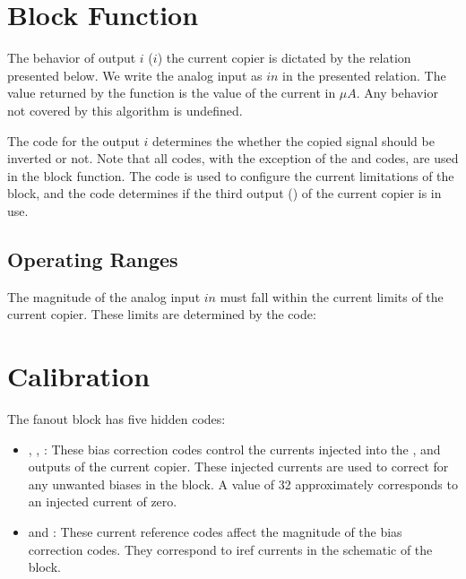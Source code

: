   
\section{Block Function}\label{fanout:blockfun}
The behavior of output $i$ ($i$) the current copier is dictated by the
relation presented below. We write the analog input as $in$ in the presented
relation. The value returned by the function is the value of the current in $\mu
A$. Any behavior not covered by this algorithm is undefined.

\begin{algorithmic}
  \EndIf
\end{algorithmic}

The  code for the output $i$ determines the whether the copied signal
should be inverted or not. Note that all \static codes, with the exception of
the  and  codes, are used in the block function. The  code is
used to configure the current limitations of the block, and the  code
determines if the third output () of the current copier is in use.

\subsection{Operating Ranges}

The magnitude of the analog input $in$ must fall within the current limits of
the current copier. These limits are determined by the  code:

\begin{algorithmic}
\end{algorithmic}
\section{Calibration}\label{fanout:calib}

The fanout block has five hidden codes:

\begin{itemize}
\item{}, , : These bias
  correction codes control the currents injected into
  the ,  and  outputs of the current copier. These
  injected currents are used to correct for any unwanted biases in the block. A
   value of 32 approximately corresponds to an injected current of zero.
\item{} and : These current reference codes affect the magnitude of the
  bias correction codes. They correspond to iref currents in the schematic of
  the block. 
\end{itemize}


